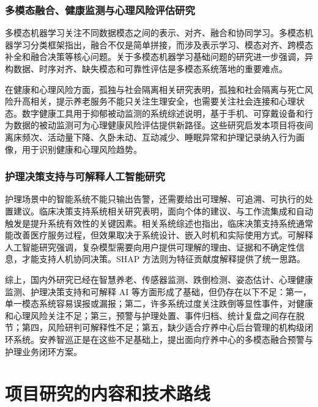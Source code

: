\documentclass[UTF8,a4paper,zihao=-4,fontset=fandol]{ctexart}
\begin{document}
\subsubsection{多模态融合、健康监测与心理风险评估研究}

多模态机器学习关注不同数据模态之间的表示、对齐、融合和协同学习。多模态机器学习分类框架指出，融合不仅是简单拼接，而涉及表示学习、模态对齐、跨模态补全和融合决策等核心问题\cite{baltrusaitis2019multimodal}。关于多模态机器学习基础问题的研究进一步强调，异构数据、时序对齐、缺失模态和可靠性评估是多模态系统落地的重要难点\cite{liang2022foundations}。

在健康和心理风险方面，孤独与社会隔离相关研究表明，孤独和社会隔离与死亡风险升高相关，提示养老服务不能只关注生理安全，也需要关注社会连接和心理状态\cite{holtlunstad2015loneliness}。数字健康工具用于抑郁被动监测的系统综述说明，基于手机、可穿戴设备和行为数据的被动监测可为心理健康风险评估提供新路径\cite{sequeira2021digital}。这些研究启发本项目将夜间离床频次、活动量下降、久卧未动、互动减少、睡眠异常和护理记录纳入行为画像，用于识别健康和心理风险趋势。

\subsubsection{护理决策支持与可解释人工智能研究}

护理场景中的智能系统不能只输出告警，还需要给出可理解、可追溯、可执行的处置建议。临床决策支持系统相关研究表明，面向个体的建议、与工作流集成和自动触发是提升系统有效性的关键因素\cite{kawamoto2005cdss}。相关系统综述也指出，临床决策支持系统通常能改善医疗服务过程，但效果取决于系统设计、嵌入时机和实际使用方式\cite{bright2012cdss}。可解释人工智能研究强调，复杂模型需要向用户提供可理解的理由、证据和不确定性信息，才能支持人机协同决策\cite{gunning2019xai}。SHAP 方法则为特征贡献度解释提供了统一思路\cite{lundberg2017shap}。

综上，国内外研究已经在智慧养老、传感器监测、跌倒检测、姿态估计、心理健康监测、护理决策支持和可解释 AI 等方面形成了基础，但仍存在以下不足：第一，单一模态系统容易误报或漏报；第二，许多系统过度关注跌倒等显性事件，对健康和心理风险关注不足；第三，预警与护理处置、事件归档、统计复盘之间存在脱节；第四，风险研判可解释性不足；第五，缺少适合疗养中心后台管理的机构级闭环系统。安养智巡正是在这些不足基础上，提出面向疗养中心的多模态融合预警与护理业务闭环方案。

\section{项目研究的内容和技术路线}
\end{document}
